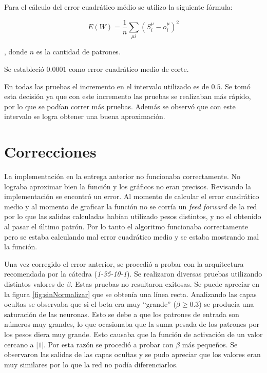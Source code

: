 \documentclass[11pt,a4paper]{article}
\begin{document}
Para el cálculo del error cuadrático médio se utilizo la siguiente fórmula:

$$E(W) = \frac{1}{n} \sum_{\mu i}{(S_i^{\mu} - o_i^{\mu})^2}$$

, donde $n$ es la cantidad de patrones.

Se estableció $0.0001$ como error cuadrático medio de corte.

En todas las pruebas el incremento en el intervalo utilizado es de $0.5$. Se tomó esta decisión ya que con este incremento las pruebas se realizaban más rápido, por lo que se podían correr más pruebas. Además se observó que con este intervalo se logra obtener una buena aproximación.

\section{Correcciones}

La implementación en la entrega anterior no funcionaba correctamente. No lograba aproximar bien la función y los gráficos no eran precisos. Revisando la implementación se encontró un error. Al momento de calcular el error cuadrático medio y al momento de graficar la función no se corría un \emph{feed forward} de la red por lo que las salidas calculadas habían utilizado pesos distintos, y no el obtenido al pasar el último patrón. Por lo tanto el algoritmo funcionaba correctamente pero se estaba calculando mal error cuadrático medio y se estaba mostrando mal la función.

Una vez corregido el error anterior, se procedió a probar con la arquitectura recomendada por la cátedra (\emph{1-35-10-1}). Se realizaron diversas pruebas utilizando distintos valores de $\beta$. Estas pruebas no resultaron exitosas. Se puede apreciar en la figura \ref{fig:sinNormalizar} que se obtenía una línea recta. Analizando las capas ocultas se observaba que si el beta era muy ``grande'' ($\beta \geq 0.3$) se producía una saturación de las neuronas. Esto se debe a que los patrones de entrada son números muy grandes, lo que ocasionaba que la suma pesada de los patrones por los pesos diera muy grande. Esto causaba que la función de activación de un valor cercano a |$1$|. Por esta razón se procedió a probar con $\beta$ más pequeños. Se observaron las salidas de las capas ocultas y se pudo apreciar que los valores eran muy similares por lo que la red no podía diferenciarlos.
\end{document}
